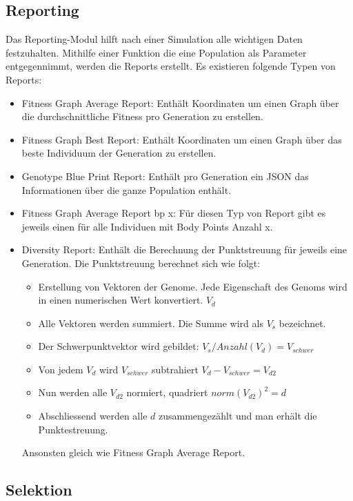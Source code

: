     \subsection{Reporting\label{subsec:Reporting}}

      Das Reporting-Modul hilft nach einer Simulation alle wichtigen Daten festzuhalten.
      Mithilfe einer Funktion die eine Population als Parameter entgegennimmt,
      werden die Reports erstellt. Es existieren folgende Typen von Reports:
      \begin{itemize}
        \item Fitness Graph Average Report: Enthält Koordinaten um einen Graph über die durchschnittliche Fitness pro Generation zu erstellen.
        \item Fitness Graph Best Report: Enthält Koordinaten um einen Graph über das beste Individuum der Generation zu erstellen.
        \item Genotype Blue Print Report: Enthält pro Generation ein JSON das Informationen über die ganze Population enthält.
        \item Fitness Graph Average Report bp x: Für diesen Typ von Report gibt es jeweils einen für alle Individuen mit Body Points Anzahl x.
        \item Diversity Report: Enthält die Berechnung der Punktstreuung für jeweils eine Generation. Die Punktstreuung berechnet sich wie folgt:
        \begin{itemize}
          \item Erstellung von Vektoren der Genome. Jede Eigenschaft des Genoms wird in einen numerischen Wert konvertiert. \( V_d \)
          \item Alle Vektoren werden summiert.  Die Summe wird als \(V_s\) bezeichnet.
          \item Der Schwerpunktvektor wird gebildet: \( V_s / Anzahl(V_d) = V_{schwer} \)
          \item Von jedem \(V_d\) wird \(V_{schwer}\) subtrahiert  \( V_d - V_{schwer}  = V_{d2} \)
          \item Nun werden alle \(V_{d2}\) normiert, quadriert \( norm{(V_{d2})}^2 = d \)
          \item Abschliessend werden alle \(d\) zusammengezählt und man erhält die Punktestreuung.
        \end{itemize}
        Ansonsten gleich wie Fitness Graph Average Report.
      \end{itemize}

    \subsection{Selektion\label{sec:Selektion}}

